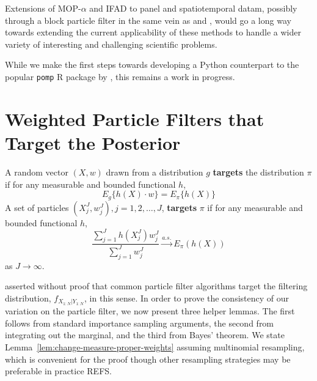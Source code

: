 \documentclass{article}
\begin{document}
Extensions of MOP-$\alpha$ and IFAD to panel and spatiotemporal datam, possibly through a block particle filter in the same vein as \cite{ionides22} and \cite{ning23}, would go a long way towards extending the current applicability of these methods to handle a wider variety of interesting and challenging scientific problems. 

While we make the first steps towards developing a Python counterpart to the popular \texttt{pomp} R package by \citet{king16, king2017pompmanual}, this remains a work in progress. 





\appendix
\renewcommand{\thefigure}{A\arabic{figure}}
\setcounter{figure}{0}

\section{Weighted Particle Filters that Target the Posterior}


\begin{defn}[Targeting]
    A random vector $(X, w)$ drawn from a distribution $g$ \textbf{targets} the distribution $\pi$ if for any measurable and bounded functional $h$,
\begin{equation}
    E_g\{h(X) \cdot w\}=E_\pi\{h(X)\}
\end{equation}  
    A set of particles $(X^J_j, w^J_j), j=1,2, \ldots,J$, \textbf{targets} $\pi$ if for any measurable and bounded functional $h$,
\begin{equation}
    \frac{\sum_{j=1}^J h(X^J_j) w^J_j}{\sum_{j=1}^J w^J_j} \stackrel{a.s.}{\to} E_\pi(h(X))
\end{equation}
as $J \to \infty$.
\end{defn}
\citet{chopin2004clt} asserted without proof that common particle filter algorithms target the filtering distribution, $f_{X_{1:N}|Y_{1:N}}$, in this sense.
In order to prove the consistency of our variation on the particle filter, we now present three helper lemmas.
The first follows from standard importance sampling arguments, the second from integrating out the marginal, and the third from Bayes' theorem. 
We state Lemma~\ref{lem:change-measure-proper-weights} assuming multinomial resampling, which is convenient for the proof though other resampling strategies may be preferable in practice REFS.
\end{document}
